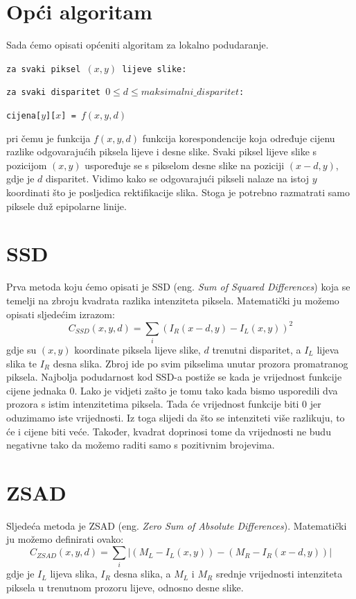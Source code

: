 \documentclass[utf8, zavrsni, numeric]{fer}
\begin{document}
\section{Opći algoritam}
Sada ćemo opisati općeniti algoritam za lokalno podudaranje.

{\tt za svaki piksel $(x, y)$ lijeve slike:}

{\quad \tt za svaki disparitet $0 \leq d \leq maksimalni\_ disparitet$:}

{\quad\quad \tt cijena[$y$][$x$] = $f(x, y, d)$}    


\noindent pri čemu je funkcija $f(x, y, d)$ funkcija korespondencije koja određuje cijenu razlike odgovarajućih piksela lijeve i desne slike. Svaki piksel lijeve slike s pozicijom $(x, y)$
uspoređuje se s pikselom desne slike na poziciji $(x - d, y)$, gdje je $d$ disparitet. Vidimo kako se odgovarajući pikseli nalaze na istoj $y$ koordinati što je posljedica rektifikacije slika.
Stoga je potrebno razmatrati samo piksele duž epipolarne linije.

\section{SSD}

Prva metoda koju ćemo opisati je SSD ({eng. \sl Sum of Squared Differences}) koja se temelji na zbroju kvadrata razlika intenziteta piksela.
Matematički ju možemo opisati sljedećim izrazom:
$$C_{SSD}(x, y, d) = \sum_{i}(I_R(x - d, y) - I_L(x, y))^2 $$
gdje su $(x, y)$ koordinate piksela lijeve slike, $d$ trenutni disparitet, a $I_L$ lijeva slika te $I_R$ desna slika. Zbroj ide po svim pikselima unutar prozora promatranog piksela.
Najbolja podudarnost kod SSD-a postiže se kada je vrijednost funkcije cijene jednaka $0$. Lako je vidjeti zašto je tomu tako kada bismo usporedili dva prozora s istim intenzitetima piksela. Tada će vrijednost funkcije biti $0$ jer oduzimamo iste vrijednosti. Iz toga slijedi da što se intenziteti više razlikuju, to će i cijene biti veće. Također, kvadrat doprinosi tome da vrijednosti ne budu negativne tako da možemo raditi samo s pozitivnim brojevima.

\section{ZSAD}

Sljedeća metoda je ZSAD ({eng. \sl Zero Sum of Absolute Differences}). Matematički ju možemo definirati ovako:
$$C_{ZSAD}(x, y, d) = \sum_{i}\lvert(M_L - I_L(x, y)) - (M_R - I_R(x - d, y))\rvert$$
gdje je $I_L$ lijeva slika, $I_R$ desna slika, a $M_L$ i $M_R$ srednje vrijednosti intenziteta piksela u trenutnom prozoru lijeve, odnosno desne slike.
\end{document}

